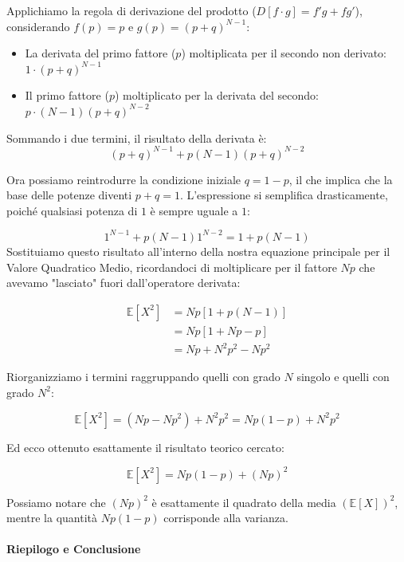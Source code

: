 Applichiamo la regola di derivazione del prodotto ($D[f \cdot g] = f'g + fg'$), considerando $f(p) = p$ e $g(p) = (p+q)^{N-1}$:
\begin{itemize}
    \item La derivata del primo fattore ($p$) moltiplicata per il secondo non derivato: $1 \cdot (p+q)^{N-1}$
    \item Il primo fattore ($p$) moltiplicato per la derivata del secondo: $p \cdot (N-1)(p+q)^{N-2}$
\end{itemize}

Sommando i due termini, il risultato della derivata è:
\[
(p+q)^{N-1} + p(N-1)(p+q)^{N-2}
\]


Ora possiamo reintrodurre la condizione iniziale $q = 1-p$, il che implica che la base delle potenze diventi $p+q = 1$.
L'espressione si semplifica drasticamente, poiché qualsiasi potenza di $1$ è sempre uguale a $1$:

\[
1^{N-1} + p(N-1)1^{N-2} = 1 + p(N-1)
\]
Sostituiamo questo risultato all'interno della nostra equazione principale per il Valore Quadratico Medio, ricordandoci di moltiplicare per il fattore $Np$ che avevamo "lasciato" fuori dall'operatore derivata:

\begin{equation}
\begin{aligned}
\mathbb{E}[X^2] &= Np \left[ 1 + p(N-1) \right] \\
&= Np \left[ 1 + Np - p \right] \\
&= Np + N^2 p^2 - Np^2
\end{aligned}
\end{equation}

Riorganizziamo i termini raggruppando quelli con grado $N$ singolo e quelli con grado $N^2$:

\[
\mathbb{E}[X^2] = (Np - Np^2) + N^2 p^2 = Np(1-p) + N^2 p^2
\]

Ed ecco ottenuto esattamente il risultato teorico cercato:

\begin{equation}
\mathbb{E}[X^2] = Np(1-p) + (Np)^2
\end{equation}

Possiamo notare che $(Np)^2$ è esattamente il quadrato della media $(\mathbb{E}[X])^2$, mentre la quantità $Np(1-p)$ corrisponde alla varianza.

\paragraph{Riepilogo e Conclusione}

